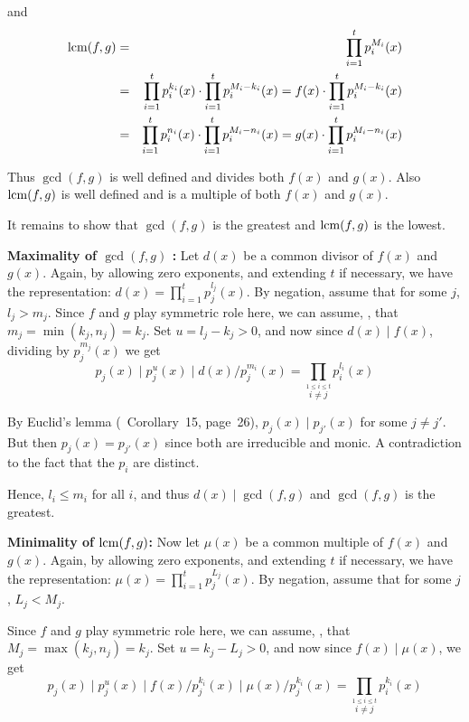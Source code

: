 \begin{myenumerate}
{and
\begin{eqnarray*}
\mathop{\rm lcm}\nolimits(f,g)
  & = & \prod_{i=1}^t p_i^{M_i}(x) \\
  & = & \prod_{i=1}^t p_i^{k_i}(x) \cdot \prod_{i=1}^t p_i^{M_i-k_i}(x) = f(x)\cdot \prod_{i=1}^t p_i^{M_i-k_i}(x) \\
  & = & \prod_{i=1}^t p_i^{n_i}(x) \cdot \prod_{i=1}^t p_i^{M_i-n_i}(x) = g(x)\cdot \prod_{i=1}^t p_i^{M_i-n_i}(x)
\end{eqnarray*}
}

Thus \(\gcd(f,g)\) is well defined and divides both \(f(x)\) and \(g(x)\).
Also  \(\mathop{\rm lcm}\nolimits(f,g)\) is well defined and is a multiple
of both \(f(x)\) and \(g(x)\).

It remains to show that \(\gcd(f,g)\) is the greatest
and \(\mathop{\rm lcm}\nolimits(f,g)\) is the lowest.

\textbf{Maximality of \(\gcd(f,g)\) :}
Let \(d(x)\) be a common divisor of \(f(x)\) and \(g(x)\).
Again, by allowing zero exponents, and extending $t$ if necessary,
we have the representation: \(d(x)=\prod_{i=1}^t p_j^{l_j}(x)\).
By negation, assume that for some $j$, \(l_j>m_j\).
Since  $f$ and $g$ play symmetric role here,
we can assume, \wlogy, that \(m_j=\min(k_j,n_j)=k_j\).
Set \(u=l_j-k_j>0\), and
now since \(d(x)\mid f(x)\), dividing by \(p_j^{m_j}(x)\) we get
\begin{equation}
p_j(x)
  \mid p_j^u(x)
  \mid d(x)/p_j^{m_i}(x)
  = \prod_{\overset{1\leq i\leq t}{i\neq j}} p_i^{l_i}(x)
\end{equation}

By Euclid's lemma (\cite{Rotman98}~Corollary~15, page~26),
\(p_j(x)\mid p_{j'}(x)\) for some \(j\neq j'\).
But then \(p_j(x)=p_{j'}(x)\) since both are irreducible and monic.
A contradiction to the fact that the \(p_i\) are distinct.

Hence, \(l_i\leq m_i\) for all $i$,
and thus \(d(x)\mid\gcd(f,g)\) and \(\gcd(f,g)\) is the greatest.

\textbf{Minimality of \(\mathop{\rm lcm}\nolimits(f,g)\):}
Now let \(\mu(x)\) be a common multiple of \(f(x)\) and \(g(x)\).
Again, by allowing zero exponents, and extending $t$ if necessary,
we have the representation: \(\mu(x)=\prod_{i=1}^t p_j^{L_j}(x)\).
By negation, assume that for some $j$, \(L_j<M_j\).

Since  $f$ and $g$ play symmetric role here,
we can assume, \wlogy, that \(M_j=\max(k_j,n_j)=k_j\).
Set \(u=k_j-L_j>0\), and
now since \(f(x)\mid \mu(x)\), %
we get
\begin{equation}
p_j(x)
  \mid p_j^u(x)
  \mid f(x)/p_j^{k_i}(x)
  \mid \mu(x)/p_j^{k_i}(x)
  = \prod_{\overset{1\leq i\leq t}{i\neq j}} p_i^{k_i}(x)
\end{equation}


\end{myenumerate}
